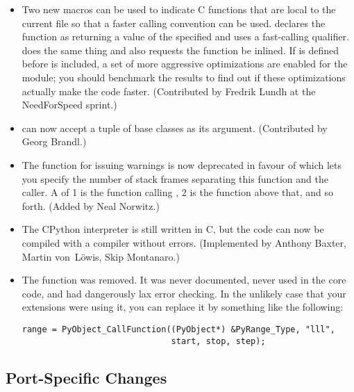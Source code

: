 \documentclass{howto}
\begin{document}
\begin{itemize}
\item Two new macros can be used to indicate C functions that are
local to the current file so that a faster calling convention can be
used.   declares the function as
returning a value of the specified  and uses a fast-calling
qualifier.  does the same thing
and also requests the function be inlined.  If
 is defined before  is
included, a set of more aggressive optimizations are enabled for the
module; you should benchmark the results to find out if these
optimizations actually make the code faster.  (Contributed by Fredrik
Lundh at the NeedForSpeed sprint.)

\item {} can now accept a tuple of base classes as its 
argument.  (Contributed by Georg Brandl.)

\item The  function for issuing warnings
is now deprecated in favour of  which lets you specify the number of stack
frames separating this function and the caller.  A  of
1 is the function calling , 2 is the
function above that, and so forth.  (Added by Neal Norwitz.)

\item The CPython interpreter is still written in C, but 
the code can now be compiled with a {\Cpp} compiler without errors.  
(Implemented by Anthony Baxter, Martin von~L\"owis, Skip Montanaro.)

\item The  function was removed.  It was
never documented, never used in the core code, and had dangerously lax
error checking.  In the unlikely case that your extensions were using
it, you can replace it by something like the following:
\begin{verbatim}
range = PyObject_CallFunction((PyObject*) &PyRange_Type, "lll", 
                              start, stop, step);
\end{verbatim}

\end{itemize}


\subsection{Port-Specific Changes\label{ports}}
\end{document}
